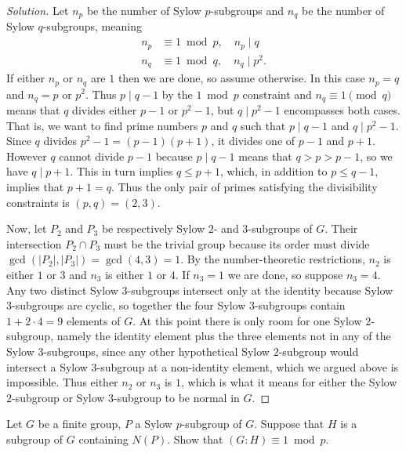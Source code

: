 \documentclass[10pt]{article}
\providecommand{\quiv}{\equiv}
\newenvironment{soln}{\begin{proof}[Solution]}{\end{proof}}
\providecommand{\abs}[1]{\left|#1\right|}
\begin{document}
\begin{soln}
    Let $n_p$ be the number of Sylow $p$-subgroups
    and $n_q$ be the number of Sylow $q$-subgroups, meaning
    \begin{align*}
        n_p &\equiv 1\bmod p,\quad n_p\mid q \\
        n_q &\equiv 1\bmod q,\quad n_q\mid p^2.
    \end{align*}
    If either $n_p$ or $n_q$ are $1$ then we are done,
    so assume otherwise. In this case $n_p = q$ and $n_q = p$ or $p^2$.
    Thus $p\mid q-1$ by the $1\bmod p$ constraint and
    $n_q\equiv 1\pmod q$ means that $q$ divides either
    $p-1$ or $p^2-1$, but $q\mid p^2-1$ encompasses both cases.
    That is, we want to find prime numbers $p$ and $q$ such that
    $p\mid q-1$ and $q\mid p^2-1$.
    Since $q$ divides $p^2-1 = (p-1)(p+1)$, it divides one of $p-1$ and $p+1$.
    However $q$ cannot divide $p-1$ because $p\mid q-1$ means that $q>p>p-1$,
    so we have $q\mid p+1$. This in turn implies $q\le p+1$,
    which, in addition to $p\le q-1$, implies that $p+1=q$.
    Thus the only pair of primes satisfying the divisibility constraints
    is $(p,q) = (2,3)$.

    Now, let $P_2$ and $P_3$ be respectively Sylow $2$- and $3$-subgroups of $G$.
    Their intersection $P_2\cap P_3$ must be the trivial group
    because its order must divide $\gcd(\abs{P_2},\abs{P_3}) = \gcd(4,3) = 1$.
    By the number-theoretic restrictions, $n_2$ is either $1$ or $3$
    and $n_3$ is either $1$ or $4$. If $n_3=1$ we are done, so suppose $n_3=4$.
    Any two distinct Sylow $3$-subgroups intersect only at the identity
    because Sylow $3$-subgroups are cyclic, so together
    the four Sylow $3$-subgroups contain $1 + 2\cdot 4 = 9$ elements of $G$.
    At this point there is only room for one Sylow $2$-subgroup,
    namely the identity element plus the three elements not in any of the
    Sylow $3$-subgroups, since any other hypothetical Sylow $2$-subgroup
    would intersect a Sylow $3$-subgroup at a non-identity element,
    which we argued above is impossible.
    Thus either $n_2$ or $n_3$ is $1$, which is what it means
    for either the Sylow $2$-subgroup or Sylow $3$-subgroup to be normal in $G$.
\end{soln}

\begin{problem}
    Let $G$ be a finite group, $P$ a Sylow $p$-subgroup of $G$.
    Suppose that $H$ is a subgroup of $G$ containing $N(P)$.
    Show that $(G:H)\quiv1\bmod p$.
\end{problem}
\end{document}
